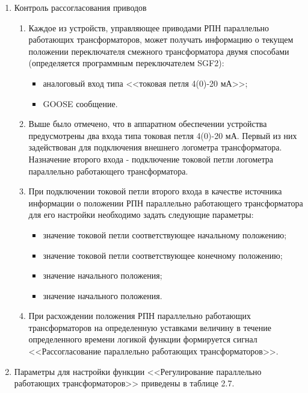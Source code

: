 \begin{enumerate}[label=\arabic{section}.\arabic{subsection}.\arabic{enumi}, labelsep=4pt, leftmargin=0pt, itemindent=57pt, itemsep=0pt, parsep=5pt]
\item Контроль рассогласования приводов
    \begin{enumerate}[label=\arabic{section}.\arabic{subsection}.\arabic{enumi}, labelsep=4pt, leftmargin=0pt, itemindent=57pt, itemsep=0pt, parsep=5pt]
        \item Каждое из устройств, управляющее приводами РПН параллельно работающих трансформаторов, может получать информацию о текущем положении переключателя смежного трансформатора двумя способами (определяется программным переключателем SGF2):
            \begin{itemize}
                \item аналоговый вход типа <<токовая петля 4(0)-20 мА>>;
                \item GOOSE сообщение.
            \end{itemize}
        \item
        Выше было отмечено, что в аппаратном обеспечении устройства предусмотрены два входа типа токовая петля 4(0)-20 мА. Первый из них задействован для подключения внешнего логометра трансформатора. Назначение второго входа  - подключение токовой петли логометра параллельно работающего трансформатора.
        \item При подключении токовой петли второго входа в качестве источника информации о положении РПН параллельно работающего трансформатора для его настройки необходимо задать следующие параметры:
            \begin{itemize}
                \item значение токовой петли соответствующее начальному положению;
                \item значение токовой петли соответствующее конечному положению;
                \item значение начального положения;
                \item значение начального положения.
            \end{itemize}
        \item 
        При расхождении положения РПН параллельно работающих трансформаторов на определенную уставками величину в течение определенного времени логикой функции формируется сигнал <<Рассогласование параллельно работающих трансформаторов>>.
    \end{enumerate}



\item 
Параметры для настройки функции <<Регулирование параллельно работающих трансформаторов>> приведены в таблице 2.7.





\end{enumerate}
